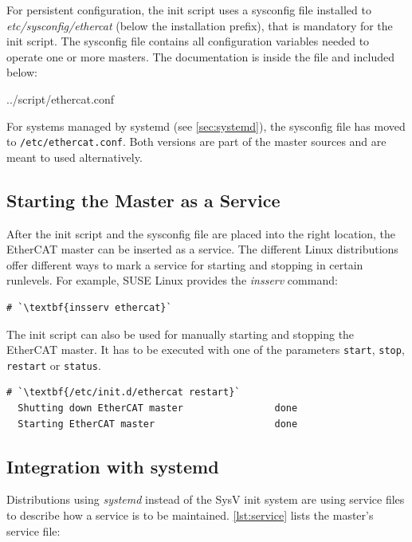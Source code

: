 \documentclass[a4paper,12pt,BCOR=6mm,bibtotoc,idxtotoc]{scrbook}
\begin{document}
For persistent configuration, the init script uses a sysconfig file installed
to \textit{etc/sysconfig/ethercat} (below the installation prefix), that is
mandatory for the init script. The sysconfig file contains all configuration
variables needed to operate one or more masters. The documentation is inside
the file and included below:


    {../script/ethercat.conf}

For systems managed by systemd (see \autoref{sec:systemd}), the sysconfig file
has moved to \lstinline+/etc/ethercat.conf+. Both versions are part of the
master sources and are meant to used alternatively.

\subsection{Starting the Master as a Service}
\label{sec:service}

After the init script and the sysconfig file are placed into the right
location, the EtherCAT master can be inserted as a service. The different Linux
distributions offer different ways to mark a service for starting and stopping
in certain runlevels. For example, SUSE Linux provides the \textit{insserv}
command:

\begin{lstlisting}
# `\textbf{insserv ethercat}`
\end{lstlisting}

The init script can also be used for manually starting and stopping
the EtherCAT master. It has to be executed with one of the parameters
\texttt{start}, \texttt{stop}, \texttt{restart} or \texttt{status}.

\begin{lstlisting}[gobble=2]
  # `\textbf{/etc/init.d/ethercat restart}`
  Shutting down EtherCAT master                done
  Starting EtherCAT master                     done
\end{lstlisting}

\subsection{Integration with systemd}
\label{sec:systemd}

Distributions using \textit{systemd} instead of the SysV init system are using service files to describe how a service is to be maintained. \autoref{lst:service} lists the master's service file:
\end{document}
